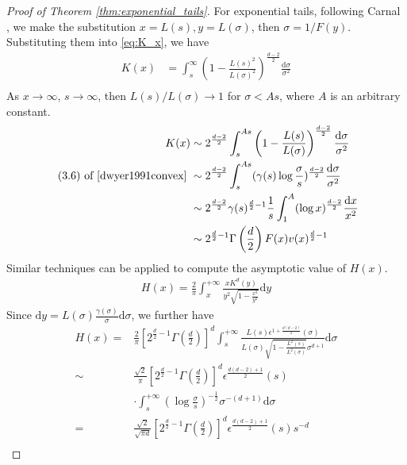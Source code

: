 \documentclass[conference,a4paper]{IEEEtran}
\def\dd{\mathrm{d}}
\begin{document}
\begin{proof}[Proof of Theorem \ref{thm:exponential_tails}]
For exponential tails, following Carnal \cite{carnal1970konvexe},
we make
the substitution $x=L(s), y=L(\sigma)$, then $\sigma=1/F(y)$.
Substituting them into \eqref{eq:K_x}, we have
\begin{align*}
    K(x)  & = \int_s^{\infty} \left(1-\frac{L(s)^2}{L(\sigma)^2} \right)^{\frac{d-2}{2}} \frac{\dd \sigma}{\sigma^2} \\
\end{align*}
As $x\to \infty$, $s\to \infty$,
then $L(s)/L(\sigma) \to 1$ for $\sigma <As$,
where $A$ is an arbitrary constant.
\begin{align*}
     K(x)& \sim 2^{\frac{d-2}{2}} 
     \int_s^{As} \left(1-\frac{L(s)}{L(\sigma)}\right)^{\frac{d-2}{2}}
     \frac{\dd \sigma}{\sigma^2} \\
     \textrm{ (3.6) of \cite{dwyer1991convex} }& 
     \sim  2^{\frac{d-2}{2}}  \int_s^{As} (\gamma(s) \log\frac{\sigma}{s})^{\frac{d-2}{2}}\frac{\dd \sigma}{\sigma^2}\\
     &\sim 2^{\frac{d-2}{2}} \gamma(s)^{\frac{d}{2}-1} \frac{1}{s} \int_1^{A} (\log x )^{\frac{d-2}{2}}\frac{\dd x}{x^2}\\
     & \sim 2^{\frac{d}{2}-1} \Gamma\left(\frac{d}{2}\right)F(x) v(x)^{\frac{d}{2}-1}    
\end{align*}
Similar techniques can be applied to compute the asymptotic value of $H(x)$.
\begin{align*}
    H(x) = \frac{2}{\pi} \int_x^{+\infty}\frac{x K^d(y)}{y^2 \sqrt{1-\frac{x^2}{y^2}}}\dd y
\end{align*}
Since $\dd y=L(\sigma)\frac{\gamma(\sigma)}{\sigma}\dd \sigma $, we further have
\begin{align*}
   H(x) =&\frac{2}{\pi}\left[2^{\frac{d}{2}-1} \Gamma\left(\frac{d}{2}\right)\right]^d
    \int_s^{+\infty}\frac{L(s) \epsilon^{1+\frac{d(d-2)}{2}}(\sigma)}{L(\sigma) \sqrt{1-\frac{L^2(s)}{L^2(\sigma)}}\sigma^{d+1}} \dd \sigma \\   
    \sim&  \frac{\sqrt{2}}{\pi}
    \left[2^{\frac{d}{2}-1} \Gamma\left(\frac{d}{2}\right)\right]^d
    \epsilon^{\frac{d(d-2)+1}{2}}(s) \\
    &\cdot\int_s^{+\infty} \left(\log\frac{\sigma}{s}
    \right)^{-\frac{1}{2}}
    \sigma^{-(d+1)}\dd \sigma \\
    =& \frac{\sqrt{2}}{\sqrt{\pi d}}\left[2^{\frac{d}{2}-1} \Gamma\left(\frac{d}{2}\right)\right]^d
    \epsilon^{\frac{d(d-2)+1}{2}}(s)s^{-d}\\

\end{align*}
\end{proof}
\end{document}
